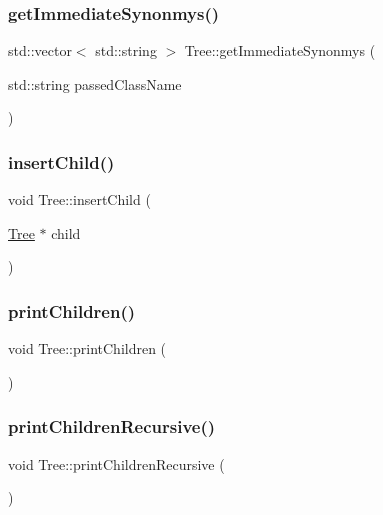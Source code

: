 \subsubsection{\texorpdfstring{get\+Immediate\+Synonmys()}{getImmediateSynonmys()}}
{\footnotesize\ttfamily std\+::vector$<$ std\+::string $>$ Tree\+::get\+Immediate\+Synonmys (\begin{DoxyParamCaption}\item[{std\+::string}]{passed\+Class\+Name }\end{DoxyParamCaption})}

\mbox{\label{class_tree_ab6fb42578015f2c2d397c68609495e53}} 
\subsubsection{\texorpdfstring{insert\+Child()}{insertChild()}}
{\footnotesize\ttfamily void Tree\+::insert\+Child (\begin{DoxyParamCaption}\item[{\hyperlink{class_tree}{Tree} $\ast$}]{child }\end{DoxyParamCaption})}

\mbox{\label{class_tree_a25c7c9886c5a882b69f775fc8a406732}} 
\subsubsection{\texorpdfstring{print\+Children()}{printChildren()}}
{\footnotesize\ttfamily void Tree\+::print\+Children (\begin{DoxyParamCaption}{ }\end{DoxyParamCaption})}

\mbox{\label{class_tree_af1f79de9a19b36ffe830fce16db57174}} 
\subsubsection{\texorpdfstring{print\+Children\+Recursive()}{printChildrenRecursive()}}
{\footnotesize\ttfamily void Tree\+::print\+Children\+Recursive (\begin{DoxyParamCaption}{ }\end{DoxyParamCaption})}

